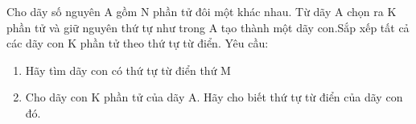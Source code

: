 Cho dãy số nguyên A gồm N phần tử đôi một khác nhau. Từ dãy A chọn ra K phần tử và giữ nguyên thứ tự như trong A tạo thành một dãy con.Sắp xếp tất cả các dãy con K phần tử theo thứ tự từ điển. Yêu cầu:  
\begin{enumerate}
	\item     Hãy tìm dãy con có thứ tự từ điển thứ M   
	\item     Cho dãy con K phần tử của dãy A. Hãy cho biết thứ tự từ điển của dãy con đó.   
\end{enumerate}

\